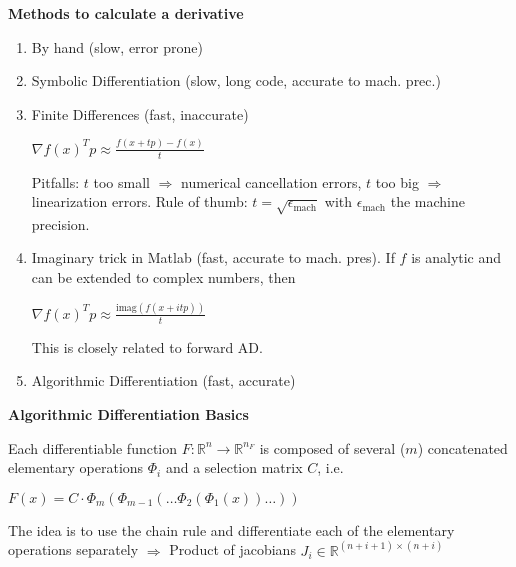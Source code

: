 \begin{tcolorbox}[colback=orange!5!white, %
  colframe=orange!75!black, %
  title=\textbf{Calculating Derivatives}]

\begin{center}
	\vspace{-0.2cm}
	\textbf{Methods to calculate a derivative}
	\vspace{-0.2cm}
\end{center}
\begin{enumerate}
	\item By hand (slow, error prone)
	\item Symbolic Differentiation (slow, long code, accurate to mach. prec.)
	\item Finite Differences (fast, inaccurate)
	\begin{center}
		\vspace{-0.1cm}
		$\nabla f(x)^Tp \approx \frac{f(x+tp)-f(x)}{t}$
		\vspace{-0.1cm}
	\end{center}
	Pitfalls: $t$ too small $\Rightarrow$ numerical cancellation errors,
	$t$ too big $\Rightarrow$ linearization errors. Rule of thumb: $t = \sqrt{\epsilon_{\text{mach}}}$ with $\epsilon_\text{mach}$ the machine precision.
	\item Imaginary trick in Matlab (fast, accurate to mach. pres). If $f$ is analytic and can be extended to complex numbers, then 
	\begin{center}
		\vspace{-0.1cm}
		$\nabla f(x)^Tp \approx \frac{\text{imag}(f(x+itp))}{t}$
		\vspace{-0.1cm}
	\end{center}
	This is closely related to forward AD.
	\item Algorithmic Differentiation (fast, accurate)
\end{enumerate}
\begin{center}
	\vspace{-0.1cm}
	\textbf{Algorithmic Differentiation Basics}
	\vspace{-0.2cm}
\end{center}
Each differentiable function $F:\mathbb{R}^n \to \mathbb{R}^{n_F}$ is composed of several ($m$) concatenated elementary operations $\Phi_i$ and a selection matrix $C$, i.e. 
\begin{center}
	\vspace{-0.1cm}
	$F(x) = C\cdot\Phi_{m}(\Phi_{m-1}(\dots\Phi_2(\Phi_1(x))\dots))$
	\vspace{-0.1cm}
\end{center}
The idea is to use the chain rule and differentiate each of the elementary operations separately $\Rightarrow$ Product of jacobians $J_i \in\mathbb{R}^{(n+i+1)\times (n+i)}$


\end{tcolorbox}
